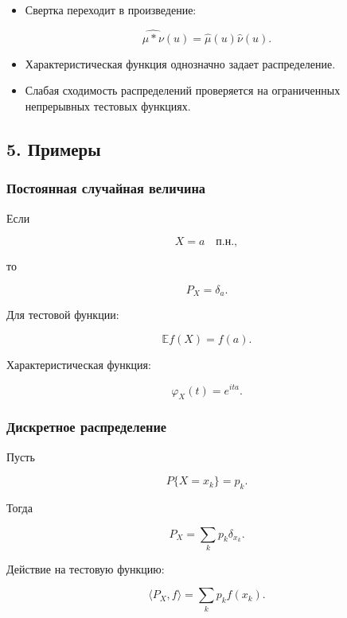\documentclass[
  11pt,
  a4paper,
]{article}
\providecommand{\tightlist}{%
  \setlength{\itemsep}{0pt}\setlength{\parskip}{0pt}}
\begin{document}
\begin{itemize}
\tightlist
\item
  Свертка переходит в произведение:
\end{itemize}

\[
\widehat{\mu*\nu}(u)=\widehat\mu(u)\widehat\nu(u).
\]

\begin{itemize}
\tightlist
\item
  Характеристическая функция однозначно задает распределение.
\item
  Слабая сходимость распределений проверяется на ограниченных
  непрерывных тестовых функциях.
\end{itemize}

\subsection{5. Примеры}\label{ux43fux440ux438ux43cux435ux440ux44b}

\subsubsection{Постоянная случайная
величина}\label{ux43fux43eux441ux442ux43eux44fux43dux43dux430ux44f-ux441ux43bux443ux447ux430ux439ux43dux430ux44f-ux432ux435ux43bux438ux447ux438ux43dux430}

Если

\[
X=a
\quad\text{п.н.},
\]

то

\[
P_X=\delta_a.
\]

Для тестовой функции:

\[
\mathbb E f(X)=f(a).
\]

Характеристическая функция:

\[
\varphi_X(t)=e^{ita}.
\]

\subsubsection{Дискретное
распределение}\label{ux434ux438ux441ux43aux440ux435ux442ux43dux43eux435-ux440ux430ux441ux43fux440ux435ux434ux435ux43bux435ux43dux438ux435}

Пусть

\[
P\{X=x_k\}=p_k.
\]

Тогда

\[
P_X=\sum_kp_k\delta_{x_k}.
\]

Действие на тестовую функцию:

\[
\langle P_X,f\rangle=\sum_kp_kf(x_k).
\]
\end{document}
